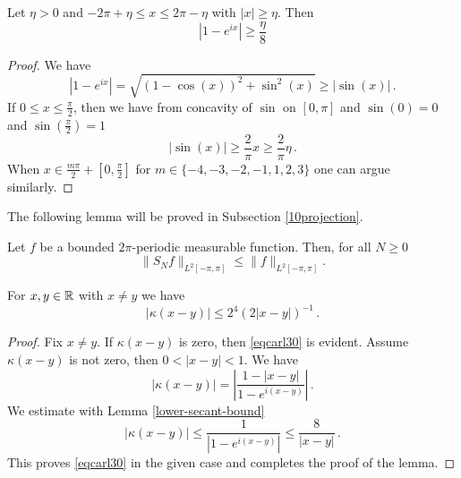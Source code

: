 {\begin{lemma}
\label{lower-secant-bound}
Let $\eta>0$ and $-2\pi +\eta \le  x\le 2\pi-\eta$ with $|x|\ge \eta$. Then
\begin{equation}
    |1-e^{ix}|\ge \frac {\eta} 8
\end{equation}
\end{lemma}
\begin{proof}

We have
$$
    |1 - e^{ix}| = \sqrt{(1 - \cos(x))^2 + \sin^2(x)} \ge |\sin(x)|\,.
$$
If $0 \le x \le \frac{\pi}{2}$, then we have from concavity of $\sin$ on $[0, \pi]$ and $\sin(0) = 0$ and $\sin(\frac{\pi}{2}) = 1$
$$
    |\sin(x)| \ge \frac{2}{\pi} x \ge \frac{2}{\pi} \eta\,.
$$
When $x\in \frac{m\pi}{2} + [0, \frac{\pi}{2}]$ for $m \in \{-4, -3, -2, -1, 1, 2, 3\}$ one can argue similarly.
 \end{proof}

The following lemma will be proved in Subsection \ref{10projection}.

\begin{lemma}
\label{spectral-projection-bound}
    Let $f$ be a bounded $2\pi$-periodic measurable function. Then, for all $N\ge 0$
   \begin{equation}\label{snbound}
   \|S_Nf\|_{L^2[-\pi, \pi]} \le \|f\|_{L^2[-\pi, \pi]}.
   \end{equation}
\end{lemma}

\begin{lemma}
\label{Hilbert-kernel-bound}
    For $x,y\in {\mathbb{R}}$ with $x\neq y$ we have
    \begin{equation}\label{eqcarl30}
        |\kappa(x-y)|\le 2^4(2|x-y|)^{-1}\, .
    \end{equation}
\end{lemma}
\begin{proof}
    Fix $x\neq y$. If $\kappa(x-y)$ is zero, then \eqref{eqcarl30} is evident. Assume $\kappa(x-y)$ is not zero, then $0<|x-y|<1$.
    We have
\begin{equation}\label{eqcarl31}
|\kappa(x-y)|=\left|\frac {1-|x-y|}{1-e^{i(x-y)}}\right|\, .
\end{equation}
We estimate
with Lemma \ref{lower-secant-bound}
\begin{equation}\label{eqcarl311}
|\kappa(x-y)|\le \frac {1}{|1-e^{i(x-y)}|}\le \frac 8{|x-y|}\, .
\end{equation}
This proves \eqref{eqcarl30} in the given case and completes the proof of the lemma.
\end{proof}

}
